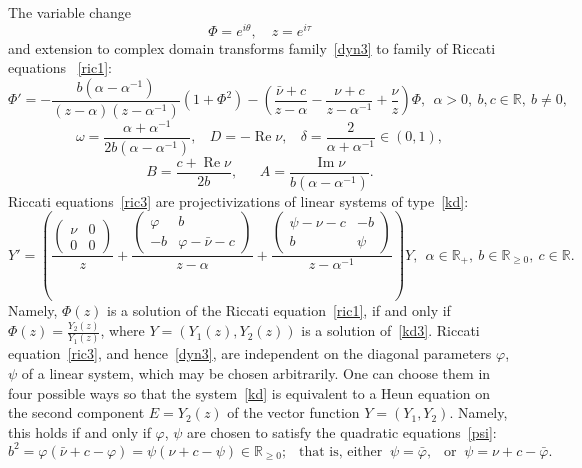 \documentclass[preprint,12pt]{elsarticle}
\theoremstyle{plain}
\renewcommand{\phi}{\varphi}
\DeclareMathOperator{\im}{\mathrm{Im}}
\DeclareMathOperator{\re}{\mathrm{Re}}
\def\a{\alpha}
\def\baml{\alpha^{-1}}
\def\difa{\a-\a^{-1}}
\def\zaal{(z-\a)(z-\baml)}
\numberwithin{equation}{section}
\numberwithin{equation}{section}
\begin{document}
The variable change
\begin{equation*}
    \Phi=e^{i\theta},\quad z=e^{i\tau}
\end{equation*}
and extension to complex domain transforms family~\eqref{dyn3} to family of Riccati equations
~\eqref{ric1}:
\begin{equation}\Phi'=-\frac{b(\difa)}{\zaal}(1+\Phi^2)-\left(\frac{\bar\nu+c}{z-\a}-\frac{\nu+c}{z-\baml}+
\frac{\nu}z\right)\Phi, \ \ \a>0, \ b, c\in\mathbb{R}, \ b\neq0,\label{ric3}\end{equation}
$$\omega=\frac{\a+\baml}{2b(\difa)}, \ \ \  \ D=-\re\nu, \ \ \ \ \delta=\frac2{\a+\baml}\in(0,1),$$
\begin{equation} 
B=\frac{c+\re\nu}{2b}, \ \ \ \ \ \ \  A=\frac{\im\nu}{b(\difa)}.\label{coefd3}\end{equation}
Riccati equations~\eqref{ric3} are projectivizations of 
linear systems of type~\eqref{kd}:
\begin{equation} Y'=\left(\frac{\left(\begin{matrix}\nu & 0\\ 0 & 0\end{matrix}\right)}z+
\frac{\left(\begin{matrix}\phi & b\\ -b & \phi-\bar\nu-c\end{matrix}\right)}{z-\alpha}  + \frac{\left(\begin{matrix}\psi-\nu-c & 
-b\\ b & \psi\end{matrix}\right)}{z-\alpha^{-1}}\right)Y, \ \ \a\in\mathbb{R}_+, \   b\in\mathbb{R}_{\geq0}, \   c\in\mathbb{R}.  \label{kd3}\end{equation}
Namely, $\Phi(z)$ is a solution of the Riccati equation~\eqref{ric1}, if and only if $\Phi(z)=\frac{Y_2(z)}{Y_1(z)}$, where
$Y=(Y_1(z), Y_2(z))$ is a solution of~\eqref{kd3}. 
Riccati equation~\eqref{ric3}, and hence~\eqref{dyn3}, are independent on the diagonal parameters $\phi$, $\psi$ of a linear system, which may be chosen arbitrarily. One can choose them in four possible ways so that the system~\eqref{kd} is equivalent to a Heun equation on the second component $E=Y_2(z)$ of the vector function $Y=(Y_1,Y_2)$. Namely, this holds if and only if $\phi$, $\psi$ are chosen to satisfy the quadratic equations~\eqref{psi}: 
\begin{equation}b^2=\phi(\bar\nu+c-\phi)=\psi(\nu+c-\psi)\in\mathbb{R}_{\geq0}; \ \ \text{ that is,  either } \ \psi=\bar\phi, \ \ \text{ or } \ \psi=\nu+c-\bar\phi.\label{psi3}\end{equation}
\end{document}
